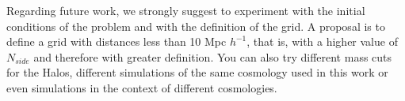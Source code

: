 \documentclass[usenatbib]{mnras}
\begin{document}
Regarding future work, we strongly suggest to experiment with the initial conditions of the problem and with the definition of the grid. A proposal is to define a grid with distances less than 10 Mpc $h^{-1}$, that is, with a higher value of $N_{side}$ and therefore with greater definition. You can also try different mass cuts for the Halos, different simulations of the same cosmology used in this work or even simulations in the context of different cosmologies.\\

\cite{2018A&A...616A..60O}


\end{document}
